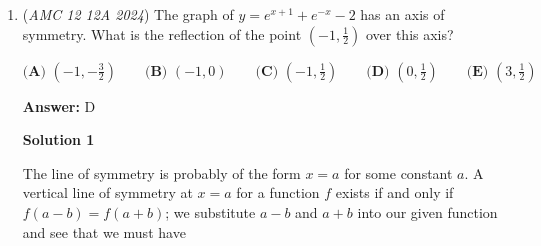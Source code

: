\begin{enumerate}
 



\textbf{Solution 4}

Let the common ratio of the geometric sequence be $\frac{x}{y}$, with $x>y$. This means that $720(\frac{x}{y})$ and $720(\frac{y}{x})$ must both be integers, therefore $x$ and $y$ are both factors of $720$. We would achieve the smallest ratio $\frac{x}{y}$ if $x$ and $y$ are consecutive, so by listing out the factors of $720$, we find that $1$, $2$, $3$, $4$, $5$, $6$, $8$, $9$, $10$, $15$, $16$ are the only consecutive factors (any factors larger than these would result in the ratio simplifying, making it larger than just using consecutive integers). $15$ and $16$ are the largest, so we find the common ratio to be $\frac{16}{15}$, making $b=720(\frac{16}{15})$ giving us $768$. The sum of its digits is $\boxed{\textbf{(E) } 21}$.

 



\textbf{Solution 5 (similar to other solutions)}

We look for the smallest possible increasing ratio in the geometric sequence for $a$, $720$, and $b$.First, we find the prime factorization of $720$, which is really easy $720=2^4\cdot3^2\cdot5$. Then, we look for the closest possible fraction-ratio out of the primes, and after a quick look, it's easy to see it is $16$ and $15$. Now that we found our ratio, we multiply $720$ by $\frac{16}{15}$ to get $768$, so the sum of the digits of the least possible value of $b$ is $\boxed{\textbf{(E) } 21}$..

 NOTE: It's not 9/8 because we want it to be as close as possible to 1 ~gabrielle.esther

 


	\item (\textit{AMC 12 12A 2024}) The graph of $y=e^{x+1}+e^{-x}-2$ has an axis of symmetry. What is the reflection of the point $(-1,\frac{1}{2})$ over this axis?


 $\textbf{(A) }\left(-1,-\frac{3}{2}\right)\qquad\textbf{(B) }(-1,0)\qquad\textbf{(C) }\left(-1,\frac{1}{2}\right)\qquad\textbf{(D) }\left(0,\frac{1}{2}\right)\qquad\textbf{(E) }\left(3,\frac{1}{2}\right)$

 \textbf{Answer: }D



\textbf{Solution 1}

The line of symmetry is probably of the form $x=a$ for some constant $a$. A vertical line of symmetry at $x=a$ for a function $f$ exists if and only if $f(a-b)=f(a+b)$; we substitute $a-b$ and $a+b$ into our given function and see that we must have 


\end{enumerate}
